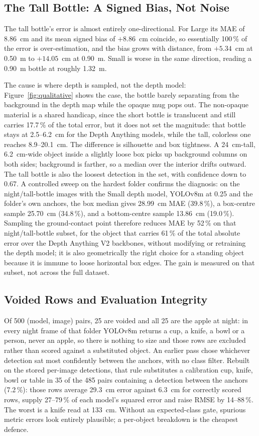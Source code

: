 \documentclass[conference]{IEEEtran}
\begin{document}
\subsection{The Tall Bottle: A Signed Bias, Not Noise}
\label{sec:b01}
The tall bottle's error is almost entirely one-directional. For Large its MAE of
8.86~cm and its mean signed bias of $+8.86$~cm coincide, so essentially 100\,\%
of the error is over-estimation, and the bias grows with distance, from
$+5.34$~cm at 0.50~m to $+14.05$~cm at 0.90~m. Small is worse in the same
direction, reading a 0.90~m bottle at roughly 1.32~m.

The cause is where depth is sampled, not the depth model: Figure~\ref{fig:qualitative}
shows the case, the bottle barely separating from the background in the
depth map while the opaque mug pops out. The non-opaque material is a shared
handicap, since the short bottle is translucent and still carries 17.7\,\% of the
total error, but it does not set the magnitude: that bottle stays at 2.5--6.2~cm
for the Depth Anything models, while the tall, colorless one reaches
8.9--20.1~cm.
The difference is silhouette and box tightness. A 24~cm-tall,
6.2~cm-wide object inside a slightly loose box picks up background columns on
both sides; background is farther, so a median over the interior drifts outward.
The tall bottle is also the loosest detection in the set, with confidence down to
0.67. A controlled sweep on the hardest folder confirms the diagnosis: on the
night/tall-bottle images with the Small depth model, YOLOv8m at 0.25 and the
folder's own anchors, the box median gives 28.99~cm MAE (39.8\,\%), a
box-centre sample 25.70~cm (34.8\,\%), and a bottom-centre sample 13.86~cm
(19.0\,\%). Sampling the ground-contact point therefore reduces MAE by 52\,\% on
that night/tall-bottle subset, for the object that carries 61\,\% of the total
absolute error over the Depth Anything V2 backbones, without modifying or
retraining the depth model; it is also geometrically the right choice
for a standing object because it is immune to loose horizontal box edges. The
gain is measured on that subset, not across the full dataset.

\subsection{Voided Rows and Evaluation Integrity}
\label{sec:integrity}
Of 500 (model, image) pairs, 25 are voided and all 25 are the apple at night:
in every night frame of that folder YOLOv8m returns a cup, a knife, a bowl or a
person, never an apple, so there is nothing to size and those rows are excluded
rather than scored against a substituted object. An earlier pass chose whichever
detection sat most confidently between the anchors, with no class filter. Rebuilt
on the stored per-image detections, that rule substitutes a calibration cup,
knife, bowl or table in 35 of the 485 pairs containing a detection between the
anchors (7.2\,\%): those rows average 29.3~cm error against 6.3~cm for correctly
scored rows, supply 27--79\,\% of each model's squared error and raise RMSE by
14--88\,\%. The worst is a knife read at 133~cm. Without an expected-class gate,
spurious metric errors look entirely plausible; a per-object breakdown is the
cheapest defence.
\end{document}
